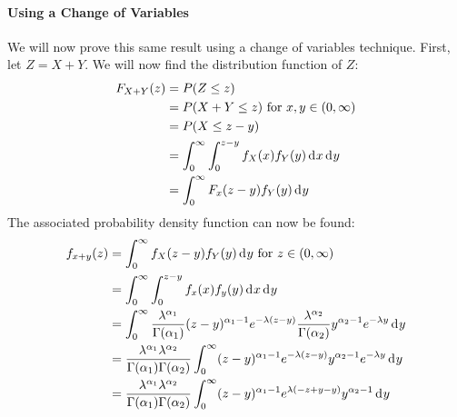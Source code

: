 \documentclass[12pt]{article}
\begin{document}
\paragraph{Using a Change of Variables}
We will now prove this same result using a change of variables technique. First, let $Z = X + Y$. We will now find the
distribution function of $Z$:
\begin{equation}
	\begin{split}
		F_{X+Y}(z)	&=	P(Z \leq z)\\
					&=	P(X+Y \leq z)\text{ for } x, y\in(0, \infty)\\
					&=	P(X \leq z - y)\\
					&=	\int_{0}^{\infty} \int_{0}^{z-y} f_X (x) f_Y (y)\mathop{}\!\mathrm{d^{}}x\mathop{}\!\mathrm{d^{}}y\\
					&=	\int_{0}^{\infty} F_x (z-y) f_Y (y)\mathop{}\!\mathrm{d^{}}y\\
	\end{split}
\end{equation}
The associated probability density function can now be found:
\begin{equation}
	\begin{split}
		f_{x+y}(z)	&=	\int_{0}^{\infty} f_X(z-y)f_Y (y)\mathop{}\!\mathrm{d^{}}y \text{ for } z\in(0, \infty)\\
					&=	\int_{0}^{\infty} \int_{0}^{z-y} f_x(x)f_y(y)\mathop{}\!\mathrm{d^{}}x\mathop{}\!\mathrm{d^{}}y\\
					&=	\int_{0}^{\infty} \frac{\lambda^{\alpha_1}}{\Gamma(\alpha_1)} (z-y)^{\alpha_1 - 1} e^{-\lambda(z-y)} \frac{\lambda^{\alpha_2}}{\Gamma(\alpha_2)} y^{\alpha_2 - 1} e^{-\lambda y}\mathop{}\!\mathrm{d^{}}y\\
					&=	\frac{\lambda^{\alpha_1} \lambda^{\alpha_2}}{\Gamma(\alpha_1) \Gamma(\alpha_2)} \int_{0}^{\infty} (z-y)^{\alpha_1 - 1} e^{-\lambda(z-y)} y^{\alpha_2 - 1} e^{-\lambda y}\mathop{}\!\mathrm{d^{}}y\\
					&=	\frac{\lambda^{\alpha_1} \lambda^{\alpha_2}}{\Gamma(\alpha_1) \Gamma(\alpha_2)} \int_{0}^{\infty} (z-y)^{\alpha_1 - 1} e^{\lambda(-z+y-y)} y^{\alpha_2 - 1}\mathop{}\!\mathrm{d^{}}y\\
	\end{split}
\end{equation}
\end{document}
